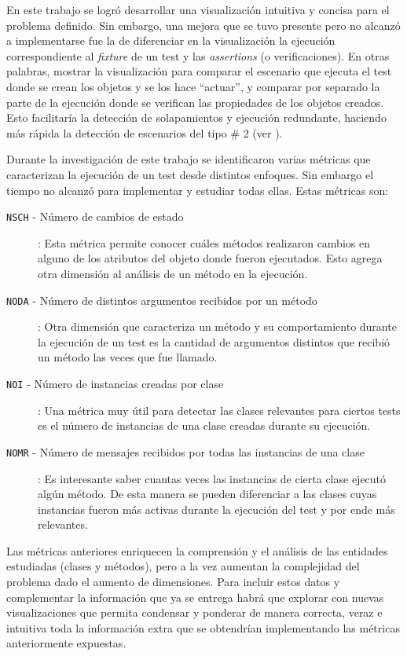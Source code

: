 \par En este trabajo se logró desarrollar una visualización intuitiva y concisa para el problema definido. Sin embargo, una mejora que se tuvo presente pero no alcanzó a implementarse fue la de diferenciar en la visualización la ejecución correspondiente al \emph{fixture} de un test y las \emph{assertions} (o verificaciones). En otras palabras, mostrar la visualización para comparar el escenario que ejecuta el test donde se crean los objetos y se los hace ``actuar'', y comparar por separado la parte de la ejecución donde se verifican las propiedades de los objetos creados. Esto facilitaría la detección de solapamientos y ejecución redundante, haciendo más rápida la detección de escenarios del tipo \# 2 (ver ).

\par Durante la investigación de este trabajo se identificaron varias métricas que caracterizan la ejecución de un test desde distintos enfoques. Sin embargo el tiempo no alcanzó para implementar y estudiar todas ellas. Estas métricas son:

\begin{description}
\item[{\tt NSCH} - Número de cambios de estado]: Esta métrica permite conocer cuáles métodos realizaron cambios en alguno de los atributos del objeto donde fueron ejecutados. Esto agrega otra dimensión al análisis de un método en la ejecución.
\item[{\tt NODA} - Número de distintos argumentos recibidos por un método]: Otra dimensión que caracteriza un método y su comportamiento durante la ejecución de un test es la cantidad de argumentos distintos que recibió un método las veces que fue llamado.
\item[{\tt NOI} - Número de instancias creadas por clase]: Una métrica muy útil para detectar las clases relevantes para ciertos tests es el número de instancias de una clase creadas durante su ejecución. 
\item[{\tt NOMR} - Número de mensajes recibidos por todas las instancias de una clase]: Es interesante saber cuantas veces las instancias de cierta clase ejecutó algún método. De esta manera se pueden diferenciar a las clases cuyas instancias fueron más activas durante la ejecución del test y por ende más relevantes.

\end{description}

\par Las métricas anteriores enriquecen la comprensión y el análisis de las entidades estudiadas (clases y métodos), pero a la vez aumentan la complejidad del problema dado el aumento de dimensiones. Para incluir estos datos y complementar la información que ya se entrega habrá que explorar con nuevas visualizaciones que permita condensar y ponderar de manera correcta, veraz e intuitiva toda la información extra que se obtendrían implementando las métricas anteriormente expuestas.


